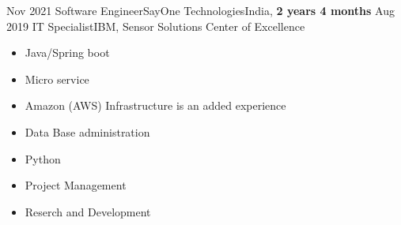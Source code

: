 \begin{experiences}
  \consultantexperience
  {Nov 2021}   {Software Engineer}{SayOne Technologies}{India,  \textbf{ 2 years 4 months}}
  {Aug 2019}   {IT Specialist}{IBM, Sensor Solutions Center of Excellence}
                    {
                      \begin{itemize}
                        \item Java/Spring boot 
                        \item Micro service 
                        \item Amazon (AWS) Infrastructure is an added experience
                        \item Data Base administration           
                        \item Python     
                        \item Project Management   
                        \item Reserch and Development   

\end{itemize}}
\end{experiences}
